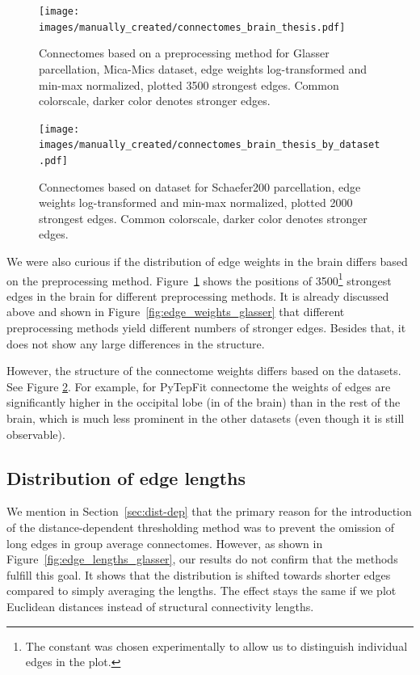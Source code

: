 \begin{figure}[p]
  \begin{center}
    \texttt{[image: images/manually\_created/connectomes\_brain\_thesis.pdf]}
  \end{center}
  \caption[Connectomes based on preprocessing method]{Connectomes based on a preprocessing method for Glasser parcellation, Mica-Mics dataset, edge weights log-transformed and min-max normalized, plotted 3500 strongest edges. Common colorscale, darker color denotes stronger edges.}
  \label{fig:connectomes_mica}
\end{figure}

\begin{figure}[p]
  \begin{center}
    \texttt{[image: images/manually\_created/connectomes\_brain\_thesis\_by\_dataset.pdf]}
  \end{center}
  \caption[Connectomes based on dataset]{Connectomes based on dataset for Schaefer200 parcellation, edge weights log-transformed and min-max normalized, plotted 2000 strongest edges. Common colorscale, darker color denotes stronger edges.}
  \label{fig:connectomes_by_dataset}
\end{figure}

We were also curious if the distribution of edge weights in the brain differs based on the preprocessing method. Figure~\ref{fig:connectomes_mica} shows the positions of 3500\footnote{The constant was chosen experimentally to allow us to distinguish individual edges in the plot.} strongest edges in the brain for different preprocessing methods. It is already discussed above and shown in Figure~\ref{fig:edge_weights_glasser} that different preprocessing methods yield different numbers of stronger edges. Besides that, it does not show any large differences in the structure.

However, the structure of the connectome weights differs based on the datasets. See Figure \ref{fig:connectomes_by_dataset}. For example, for PyTepFit connectome the weights of edges are significantly higher in the occipital lobe (in  of the brain) than in the rest of the brain, which is much less prominent in the other datasets (even though it is still observable).

\subsection{Distribution of edge lengths}

We mention in Section~\ref{sec:dist-dep} that the primary reason for the introduction of the distance-dependent thresholding method was to prevent the omission of long edges in group average connectomes. However, as shown in Figure~\ref{fig:edge_lengths_glasser}, our results do not confirm that the methods fulfill this goal. It shows that the distribution is shifted towards shorter edges compared to simply averaging the lengths. The effect stays the same if we plot Euclidean distances instead of structural connectivity lengths. 


